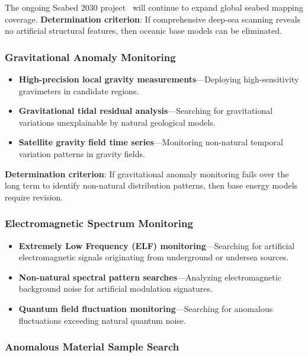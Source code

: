 \documentclass[aps,prd,twocolumn,superscriptaddress,nofootinbib]{revtex4-2}
\begin{document}
The ongoing Seabed 2030 project~\cite{Seabed2030} will continue to expand global seabed mapping coverage. \textbf{Determination criterion}: If comprehensive deep-sea scanning reveals no artificial structural features, then oceanic base models can be eliminated.

\subsubsection{Gravitational Anomaly Monitoring}\label{sec:grav-monitoring}

\begin{itemize}
  \item \textbf{High-precision local gravity measurements}---Deploying high-sensitivity gravimeters in candidate regions.
  \item \textbf{Gravitational tidal residual analysis}---Searching for gravitational variations unexplainable by natural geological models.
  \item \textbf{Satellite gravity field time series}---Monitoring non-natural temporal variation patterns in gravity fields.
\end{itemize}

\textbf{Determination criterion}: If gravitational anomaly monitoring fails over the long term to identify non-natural distribution patterns, then base energy models require revision.

\subsubsection{Electromagnetic Spectrum Monitoring}\label{sec:em-monitoring}

\begin{itemize}
  \item \textbf{Extremely Low Frequency (ELF) monitoring}---Searching for artificial electromagnetic signals originating from underground or undersea sources.
  \item \textbf{Non-natural spectral pattern searches}---Analyzing electromagnetic background noise for artificial modulation signatures.
  \item \textbf{Quantum field fluctuation monitoring}---Searching for anomalous fluctuations exceeding natural quantum noise.
\end{itemize}

\subsubsection{Anomalous Material Sample Search}\label{sec:anomalous-materials}
\end{document}
